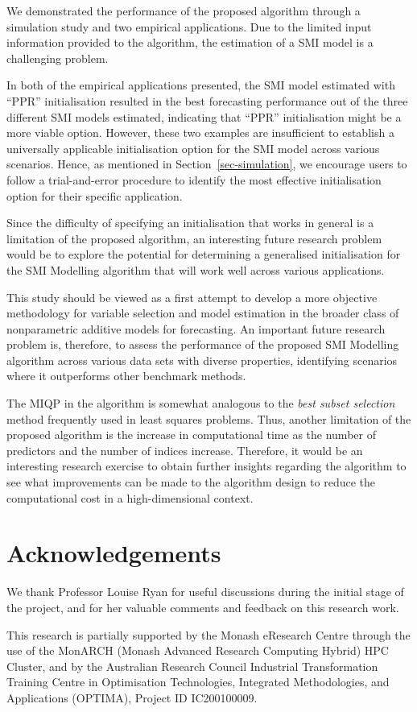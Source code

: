 \documentclass[
  11pt,
  a4paper,
]{article}
\begin{document}
We demonstrated the performance of the proposed algorithm through a
simulation study and two empirical applications. Due to the limited
input information provided to the algorithm, the estimation of a SMI
model is a challenging problem.

In both of the empirical applications presented, the SMI model estimated
with ``PPR'' initialisation resulted in the best forecasting performance
out of the three different SMI models estimated, indicating that ``PPR''
initialisation might be a more viable option. However, these two
examples are insufficient to establish a universally applicable
initialisation option for the SMI model across various scenarios. Hence,
as mentioned in Section~\ref{sec-simulation}, we encourage users to
follow a trial-and-error procedure to identify the most effective
initialisation option for their specific application.

Since the difficulty of specifying an initialisation that works in
general is a limitation of the proposed algorithm, an interesting future
research problem would be to explore the potential for determining a
generalised initialisation for the SMI Modelling algorithm that will
work well across various applications.

This study should be viewed as a first attempt to develop a more
objective methodology for variable selection and model estimation in the
broader class of nonparametric additive models for forecasting. An
important future research problem is, therefore, to assess the
performance of the proposed SMI Modelling algorithm across various data
sets with diverse properties, identifying scenarios where it outperforms
other benchmark methods.

The MIQP in the algorithm is somewhat analogous to the \emph{best subset
selection} method frequently used in least squares problems. Thus,
another limitation of the proposed algorithm is the increase in
computational time as the number of predictors and the number of indices
increase. Therefore, it would be an interesting research exercise to
obtain further insights regarding the algorithm to see what improvements
can be made to the algorithm design to reduce the computational cost in
a high-dimensional context.

\section*{Acknowledgements}\label{acknowledgements}

We thank Professor Louise Ryan for useful discussions during the initial
stage of the project, and for her valuable comments and feedback on this
research work.

This research is partially supported by the Monash eResearch Centre
through the use of the MonARCH (Monash Advanced Research Computing
Hybrid) HPC Cluster, and by the Australian Research Council Industrial
Transformation Training Centre in Optimisation Technologies, Integrated
Methodologies, and Applications (OPTIMA), Project ID IC200100009.


\printbibliography
\end{document}
